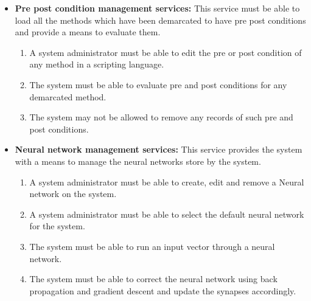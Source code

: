 \documentclass[12pt]{article}
\begin{document}
\begin{itemize}
		\item\textbf{Pre post condition management services:}
		This service must be able to load all the methods which have been demarcated to have pre post conditions and provide a means to evaluate them. 
		\begin{enumerate}		
			\item A system administrator must be able to edit the pre or post condition of any method in a scripting language.
			\item The system must be able to evaluate pre and post conditions for any demarcated method.
			\item The system may not be allowed to remove any records of such pre and post conditions.  
		\end{enumerate}
		
		\item\textbf{Neural network management services:}
		This service provides the system with a means to manage the neural networks store by the system. 
		\begin{enumerate}		
			\item A system administrator must be able to create, edit and remove a Neural network on the system.
			\item A system administrator must be able to select the default neural network for the system.			
			\item The system must be able to run an input vector through a neural network.
			\item The system must be able to correct the neural network using back propagation and gradient descent and update the synapses accordingly. 
		\end{enumerate}
	\end{itemize}		
\vspace{0.2in}

\newpage
\end{document}
